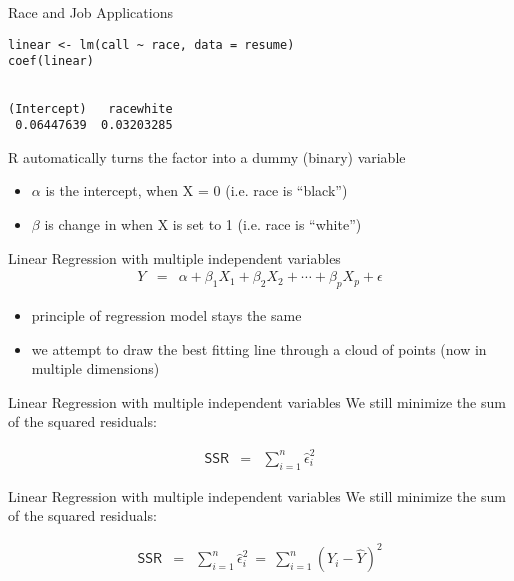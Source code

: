 \documentclass[presentation]{beamer}
\begin{document}
\begin{frame}[fragile,shrink=20,label={sec:orgc8f2bb7}]{Race and Job Applications}
 \begin{verbatim}
linear <- lm(call ~ race, data = resume)
coef(linear)
\end{verbatim}

\begin{verbatim}

(Intercept)   racewhite 
 0.06447639  0.03203285
\end{verbatim}

R automatically turns the factor into a dummy (binary) variable


\pause

\begin{itemize}
\item \(\alpha\) is the intercept, when X = 0 (i.e. race is ``black'')
\item \(\beta\) is change in  when X is set to 1 (i.e. race is ``white'')
\end{itemize}
\end{frame}


\begin{frame}[label={sec:orga503693}]{Linear Regression with multiple independent variables}
\begin{eqnarray*}
      Y & = & \alpha + \beta_1 X_1 + \beta_2 X_2 + \cdots + \beta_p X_p + \epsilon
\end{eqnarray*}

\begin{itemize}
\item principle of regression model stays the same

\item we attempt to draw the best fitting line through a cloud of points (now in multiple dimensions)
\end{itemize}
\end{frame}

\begin{frame}[label={sec:org38b4bb1}]{Linear Regression with multiple independent variables}
We still minimize the sum of the squared residuals:

\begin{eqnarray*}
      \textsf{SSR} & = & \sum_{i=1}^n \hat\epsilon_i^2
    \end{eqnarray*}
\end{frame}


\begin{frame}[label={sec:org3dfc89d}]{Linear Regression with multiple independent variables}
We still minimize the sum of the squared residuals:

\begin{eqnarray*}
      \textsf{SSR} & = & \sum_{i=1}^n \hat\epsilon_i^2 \ = \ \sum_{i=1}^n
                         (Y_i - \hat{Y})^2
    \end{eqnarray*}
\end{frame}
\end{document}
